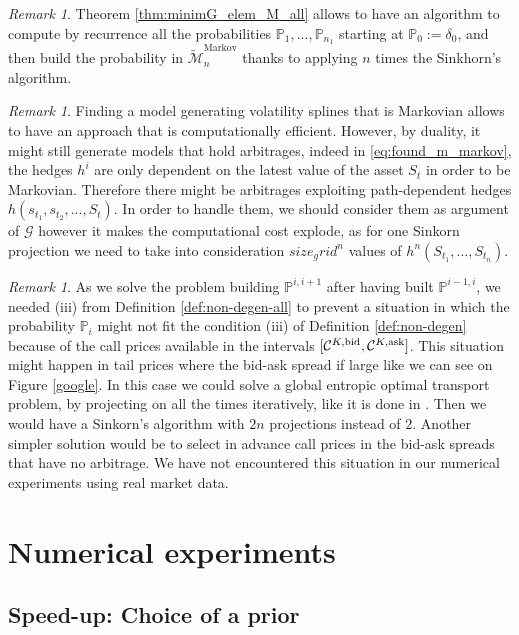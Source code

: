 \documentclass{amsart}%
\def \P{{\mathbb P}}
\def\Cc{{\cal C}}
\def\Gc{{\cal G}}
\theoremstyle{definition}
\theoremstyle{remark}
\newtheorem{rem}[thm]{Remark}
\newcommand{\cal}{\mathcal}
\begin{document}
\begin{rem}
Theorem \ref{thm:minimG_elem_M_all} allows to have an algorithm to compute by recurrence all the probabilities $\P_1,...,\P_{n_1}$ starting at $\P_0:=\delta_0$, and then build the probability in $\widetilde{\cal M}^\mathrm{Markov}_n$ thanks to applying $n$ times the Sinkhorn's algorithm.
\end{rem}


\begin{rem}
Finding a model generating volatility splines that is Markovian allows to have an approach that is computationally efficient. However, by duality, it might still generate models that hold arbitrages, indeed in \eqref{eq:found_m_markov}, the hedges $h^i$ are only dependent on the latest value of the asset $S_t$ in order to be Markovian. Therefore there might be arbitrages exploiting path-dependent hedges $h(s_{t_1},s_{t_2},...,S_t)$. In order to handle them, we should consider them as argument of $\Gc$ however it makes the computational cost explode, as for one Sinkorn projection we need to take into consideration $size_grid^{n}$ values of $h^n(S_{t_1},...,S_{t_n})$.
\end{rem}


\begin{rem}
As we solve the problem building $\P^{i,i+1}$ after having built $\P^{i-1,i}$, we needed \rm{(iii)} from Definition \ref{def:non-degen-all} to prevent a situation in which the probability $\P_i$ might not fit the condition \rm{(iii)} of Definition \ref{def:non-degen} because of the call prices available in the intervals $[\Cc^{K,\rm bid},\Cc^{K,\rm ask}]$. This situation might happen in tail prices where the bid-ask spread if large like we can see on Figure \ref{google}. In this case we could solve a global entropic optimal transport problem, by projecting on all the times iteratively, like it is done in \cite{benamou2015iterative}. Then we would have a Sinkorn's algorithm with $2n$ projections instead of $2$. Another simpler solution would be to select in advance call prices in the bid-ask spreads that have no arbitrage.  We have not encountered this situation in our numerical experiments using real market data.
\end{rem}


\section{Numerical experiments}\label{sect:numerical}

\subsection{ Speed-up: Choice of a prior}\label{subsect:prior}
\end{document}
